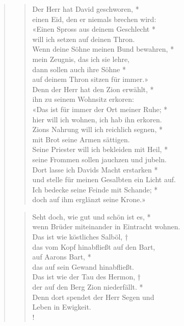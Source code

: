 \begin{quote}
\begin{verse}
Der Herr hat David geschworen, *\\ 
einen Eid, den er niemals brechen wird:\\ \vin
 «Einen Spross aus deinem Geschlecht *\\ \vin  will ich setzen auf deinen Thron.\\ 
Wenn deine Söhne meinen Bund bewahren, *\\ 
mein Zeugnis, das ich sie lehre, \\ \vin
dann sollen auch ihre Söhne *\\ \vin  auf deinem Thron sitzen für immer.»\\
Denn der Herr hat den Zion erwählt, *\\ 
ihn zu seinem Wohnsitz erkoren: \\ \vin
«Das ist für immer der Ort meiner Ruhe; *\\ \vin 
hier will ich wohnen, ich hab ihn erkoren.\\  
Zions Nahrung will ich reichlich segnen, *\\ 
mit Brot seine Armen sättigen.\\ \vin 
Seine Priester will ich bekleiden mit Heil, *\\ \vin 
seine Frommen sollen jauchzen und jubeln.\\  
Dort lasse ich Davids Macht erstarken *\\ 
und stelle für meinen Gesalbten ein Licht auf.\\ \vin  
Ich bedecke seine Feinde mit Schande; *\\ \vin 
doch auf ihm erglänzt seine Krone.»\\



\end{verse}

\begin{verse}


\smallskip

Seht doch, wie gut und schön ist es, *\\
wenn Brüder miteinander in Eintracht wohnen. \\
\vin Das ist wie köstliches Salböl, †\\
\vin das vom Kopf hinabfließt auf den Bart,\\ \vin auf Aarons Bart, *\\ \vin das auf sein Gewand hinabfließt. \\
Das ist wie der Tau des Hermon, †\\
der auf den Berg Zion niederfällt. *\\ Denn dort spendet der Herr Segen und \\ Leben in Ewigkeit. \\ !
\end{verse}

\end{quote}
